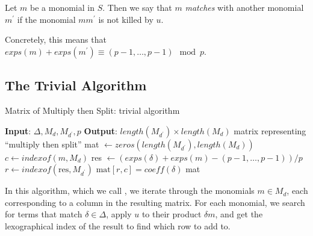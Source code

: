 
\begin{defn}
	Let \(m\) be a monomial in \(S\). 
	Then we say that \(m\) \textit{matches}
	with another monomial \(m^{\prime}\) 
	if the monomial \(mm^{\prime}\) is
	not killed by \(u\).
\end{defn}

Concretely, this means that $exps(m) + exps(m^{\prime}) \equiv (p - 1, \dots, p - 1) \mod p$.


\subsection{The Trivial Algorithm}

\begin{algorithm}[H]
    \caption{Matrix of Multiply then Split: trivial algorithm}
    \label{alg:matrix:trivial}
    \begin{algorithmic}[1]
    \State \textbf{Input}: $\Delta, M_{d}, M_{d^{\prime}}, p$
    \State \textbf{Output}: $length(M_{d^{\prime}}) \times length(M_{d})$ 
	matrix representing ``multiply then split''
    \State mat $\gets zeros(length(M_{d^{\prime}}), length(M_{d}))$
	    \State $c \gets indexof(m, M _{d})$
        \For{$\delta \in \Delta$}
             
			\State res $\gets (exps(\delta) + exps(m) - (p-1, \ldots, p-1)) / p$ 
				\State $r \gets indexof(\text{res},M_{d^{\prime}})$
                \State $\text{mat}[r, c] = coeff(\delta)$
            \EndIf
        \EndFor
    \EndFor
    \State \Return mat
    \end{algorithmic}
\end{algorithm}

In this algorithm, which we call \triv, we iterate through 
the monomials $m \in M_{d}$, each corresponding to a column in the
resulting matrix. For each monomial, we search for terms 
that match $\delta \in \Delta$, apply $u$ to their product $\delta m$, and 
get the lexographical index of the result to find which 
row to add to.

